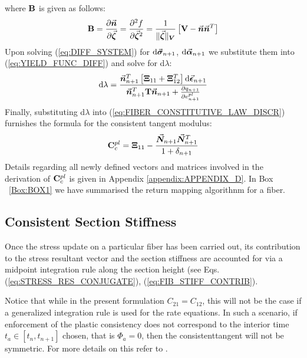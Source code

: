 \noindent where $\mathbf{B}$ is given as follows:
\begin{equation}
	\mathbf{B} = \frac{\partial\vec{\boldsymbol{n}}}{\partial \vec{\boldsymbol{\zeta}}}=
	\frac{\partial^2 f}{\partial \vec{\boldsymbol{\zeta}}^2} = \frac{1}{\Vert
		\vec{\boldsymbol{\zeta}}\Vert_{\bm{V}}}\left[ \mathbf{V}-\vec{\boldsymbol{n}}\vec{\boldsymbol{n}}^T\right]
	\label{eq:B}
\end{equation}
Upon solving (\ref{eq:DIFF_SYSTEM}) for $\text{d}\vec{\boldsymbol{\sigma}}_{n+1}$,
$\text{d}\vec{\boldsymbol{\alpha}}_{n+1}$ we substitute them into (\ref{eq:YIELD_FUNC_DIFF})
and solve for d$\lambda$:
\begin{equation}
	\text{d}\lambda =
	\frac{\vec{\boldsymbol{n}}_{n+1}^T\left[\mathbf{\Xi}_{11}+\mathbf{\Xi}_{12}^T\right]\text{d}\vec{\boldsymbol{\epsilon}}_{n+1}}{\vec{\boldsymbol{n}}_{n+1}^T\mathbf{T}\vec{\boldsymbol{n}}_{n+1}+
		\frac{\partial q_{n+1}}{\partial e_{n+1}^{pl}}}
	\label{eq:DE_GAMMA}
\end{equation}
Finally, substituting d$\lambda$ into (\ref{eq:FIBER_CONSTITUTIVE_LAW_DISCR}) 
furnishes the formula for the consistent tangent modulus:
\begin{equation}
	\mathbf{C}_c^{pl} = 
	\mathbf{\Xi}_{11}-\frac{\vec{\boldsymbol{N}}_{n+1}\vec{\boldsymbol{N}}_{n+1}^T}{1+\delta_{n+1}}
	\label{eq:CONSISTENT TANGENT MOD}
\end{equation}
Details regarding all newly defined vectors and matrices involved in the
derivation of $\mathbf{C}_c^{pl}$ is given in Appendix \ref{appendix:APPENDIX_D}. 
In Box ~\ref{Box:BOX1} 
we have summarised the return mapping algorithnm for a fiber.

\subsection{Consistent Section Stiffness}\label{section:CH3-S4SS3}

Once the stress update on a particular fiber has been carried out, its
contribution to the stress resultant vector and the section stiffness are
accounted for via a midpoint integration rule along the section height (see Eqs.
(\ref{eq:STRESS_RES_CONJUGATE}), (\ref{eq:FIB_STIFF_CONTRIB}).

Notice that while in the present formulation $C_{21}=C_{12}$, this will not be
the case if a generalized integration rule is used for the rate equations. In
such a scenario, if enforcement of the plastic consistency does not correspond
to the interior time $t_a\in[t_n, t_{n+1}]$ chosen, that is $\Phi_a=0$, then 
the consistenttangent will not be symmetric. For more details on this refer to
\cite{Ortiz1985}.

